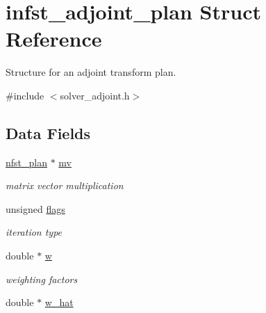 \hypertarget{structinfst__adjoint__plan}{\section{infst\-\_\-adjoint\-\_\-plan Struct Reference}
\label{structinfst__adjoint__plan}
}


Structure for an adjoint transform plan.  




{\ttfamily \#include $<$solver\-\_\-adjoint.\-h$>$}

\subsection*{Data Fields}
\begin{DoxyCompactItemize}
\item 
\hypertarget{structinfst__adjoint__plan_a02395790ff1d9e7ffc2e3fae3b927df0}{\hyperlink{structnfst__plan}{nfst\-\_\-plan} $\ast$ \hyperlink{structinfst__adjoint__plan_a02395790ff1d9e7ffc2e3fae3b927df0}{mv}}\label{structinfst__adjoint__plan_a02395790ff1d9e7ffc2e3fae3b927df0}

\begin{DoxyCompactList}\small\item\em matrix vector multiplication \end{DoxyCompactList}\item 
\hypertarget{structinfst__adjoint__plan_a8771c95bc65a49fe974389825f005ec9}{unsigned \hyperlink{structinfst__adjoint__plan_a8771c95bc65a49fe974389825f005ec9}{flags}}\label{structinfst__adjoint__plan_a8771c95bc65a49fe974389825f005ec9}

\begin{DoxyCompactList}\small\item\em iteration type \end{DoxyCompactList}\item 
\hypertarget{structinfst__adjoint__plan_a5b64034f7c01c3ce0a7ab02fd8477bdc}{double $\ast$ \hyperlink{structinfst__adjoint__plan_a5b64034f7c01c3ce0a7ab02fd8477bdc}{w}}\label{structinfst__adjoint__plan_a5b64034f7c01c3ce0a7ab02fd8477bdc}

\begin{DoxyCompactList}\small\item\em weighting factors \end{DoxyCompactList}\item 
\hypertarget{structinfst__adjoint__plan_a00f860d5af6ada0c99a252b5d7548f5b}{double $\ast$ \hyperlink{structinfst__adjoint__plan_a00f860d5af6ada0c99a252b5d7548f5b}{w\-\_\-hat}}\label{structinfst__adjoint__plan_a00f860d5af6ada0c99a252b5d7548f5b}


\end{DoxyCompactItemize}
